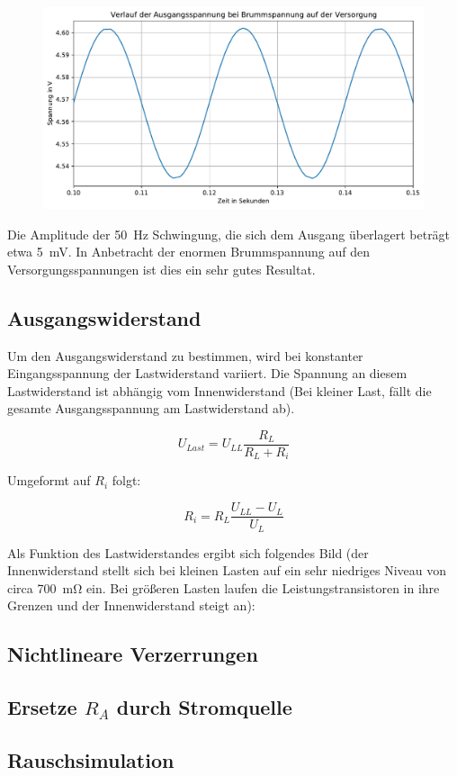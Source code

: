 \begin{figure}[H]
    \centering
    \includegraphics[width = \textwidth]{tex/5_Differenzverstaerker/pictures/Brumm.pdf}
    \label{fig:my_label}
\end{figure}

Die Amplitude der \SI{50}{\hertz} Schwingung, die sich dem Ausgang überlagert beträgt etwa \SI{5}{\milli \volt}. In Anbetracht der enormen Brummspannung auf den Versorgungsspannungen ist dies ein sehr gutes Resultat.

\subsection{Ausgangswiderstand}

Um den Ausgangswiderstand zu bestimmen, wird bei konstanter Eingangsspannung der Lastwiderstand variiert. Die Spannung an diesem Lastwiderstand ist abhängig vom Innenwiderstand (Bei kleiner Last, fällt die gesamte Ausgangsspannung am Lastwiderstand ab).

\begin{equation}
    U_{Last} = U_{LL} \frac{R_L}{R_L + R_i}
\end{equation}

Umgeformt auf $R_i$ folgt: 

\begin{equation}
    R_i = R_L \frac{U_{LL} - U_L}{U_L}
\end{equation}

Als Funktion des Lastwiderstandes ergibt sich folgendes Bild (der Innenwiderstand stellt sich bei kleinen Lasten auf ein sehr niedriges Niveau von circa \SI{700}{\milli \ohm} ein. Bei größeren Lasten laufen die Leistungstransistoren in ihre Grenzen und der Innenwiderstand steigt an):



\subsection{Nichtlineare Verzerrungen}

\subsection{Ersetze $R_A$ durch Stromquelle}

\subsection{Rauschsimulation}



